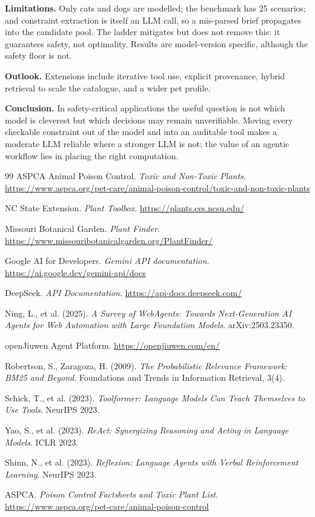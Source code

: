 \documentclass[12pt,a4paper]{article}
\begin{document}
\textbf{Limitations.} Only cats and dogs are modelled; the benchmark has 25
scenarios; and constraint extraction is itself an LLM call, so a mis-parsed
brief propagates into the candidate pool. The ladder mitigates but does not
remove this: it guarantees safety, not optimality. Results are
model-version specific, although the safety floor is not.

\textbf{Outlook.} Extensions include iterative tool use, explicit provenance,
hybrid retrieval to scale the catalogue, and a wider pet profile.

\textbf{Conclusion.} In safety-critical applications the useful question is
not which model is cleverest but which decisions may remain unverifiable.
Moving every checkable constraint out of the model and into an auditable
tool makes a moderate LLM reliable where a stronger LLM is not; the value of
an agentic workflow lies in placing the right computation.

\clearpage
\begin{thebibliography}{99}
ASPCA Animal Poison Control. \emph{Toxic and Non-Toxic Plants}.
\url{https://www.aspca.org/pet-care/animal-poison-control/toxic-and-non-toxic-plants}

NC State Extension. \emph{Plant Toolbox}.
\url{https://plants.ces.ncsu.edu/}

Missouri Botanical Garden. \emph{Plant Finder}.
\url{https://www.missouribotanicalgarden.org/PlantFinder/}

Google AI for Developers. \emph{Gemini API documentation}.
\url{https://ai.google.dev/gemini-api/docs}

DeepSeek. \emph{API Documentation}.
\url{https://api-docs.deepseek.com/}

Ning, L., et al. (2025). \emph{A Survey of WebAgents: Towards Next-Generation
AI Agents for Web Automation with Large Foundation Models}. arXiv:2503.23350.

openJiuwen Agent Platform. \url{https://openjiuwen.com/en/}

Robertson, S., Zaragoza, H. (2009). \emph{The Probabilistic Relevance Framework:
BM25 and Beyond}. Foundations and Trends in Information Retrieval, 3(4).

Schick, T., et al. (2023). \emph{Toolformer: Language Models Can Teach
Themselves to Use Tools}. NeurIPS 2023.

Yao, S., et al. (2023). \emph{ReAct: Synergizing Reasoning and Acting in
Language Models}. ICLR 2023.

Shinn, N., et al. (2023). \emph{Reflexion: Language Agents with Verbal
Reinforcement Learning}. NeurIPS 2023.

ASPCA. \emph{Poison Control Factsheets and Toxic Plant List}.
\url{https://www.aspca.org/pet-care/animal-poison-control}

\end{thebibliography}
\end{document}
